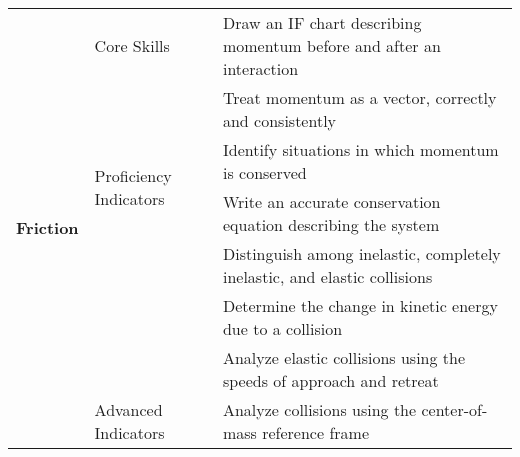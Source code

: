 \centering
{\footnotesize \begin{tabular}{| p{.35 cm} | p{1.7 cm} | p{14.3 cm} | }
\hline
\multirow{8}{*}{\begin{sideways}\parbox{4mm}{{\large{\bf Friction}}}\end{sideways}}  &Core Skills 		& Draw an IF chart describing momentum before and after an interaction  \\ \cline{3-3}
& 					& Treat momentum as a vector, correctly and consistently  \\ \cline{2-3}					
& \multirow{2}{*}{\parbox{1.7cm}{Proficiency Indicators}}	& Identify situations in which momentum is conserved \\ \cline{3-3}
&					& Write an accurate conservation equation describing the system \\ \cline{3-3}
& 					& Distinguish among inelastic, completely inelastic, and elastic collisions \\ \cline{3-3}
& 					& Determine the change in kinetic energy due to a collision \\ \cline{3-3}
&					& Analyze elastic collisions using the speeds of approach and retreat \\ \cline{2-3}
& Advanced Indicators	& Analyze collisions using the center-of-mass reference frame \\ \hline
\end{tabular} }
\vspace{2 mm}

